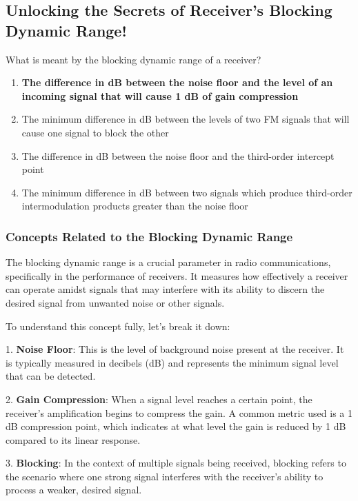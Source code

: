 \subsection{Unlocking the Secrets of Receiver's Blocking Dynamic Range!}

\begin{tcolorbox}[colback=gray!10, colframe=black, title=E4D01] What is meant by the blocking dynamic range of a receiver?
\begin{enumerate}[label=\Alph*.]
    \item \textbf{The difference in dB between the noise floor and the level of an incoming signal that will cause 1 dB of gain compression}
    \item The minimum difference in dB between the levels of two FM signals that will cause one signal to block the other
    \item The difference in dB between the noise floor and the third-order intercept point
    \item The minimum difference in dB between two signals which produce third-order intermodulation products greater than the noise floor
\end{enumerate} \end{tcolorbox}

\subsubsection{Concepts Related to the Blocking Dynamic Range}

The blocking dynamic range is a crucial parameter in radio communications, specifically in the performance of receivers. It measures how effectively a receiver can operate amidst signals that may interfere with its ability to discern the desired signal from unwanted noise or other signals.

To understand this concept fully, let's break it down:

1. \textbf{Noise Floor}: This is the level of background noise present at the receiver. It is typically measured in decibels (dB) and represents the minimum signal level that can be detected.

2. \textbf{Gain Compression}: When a signal level reaches a certain point, the receiver's amplification begins to compress the gain. A common metric used is a 1 dB compression point, which indicates at what level the gain is reduced by 1 dB compared to its linear response.

3. \textbf{Blocking}: In the context of multiple signals being received, blocking refers to the scenario where one strong signal interferes with the receiver's ability to process a weaker, desired signal. 

